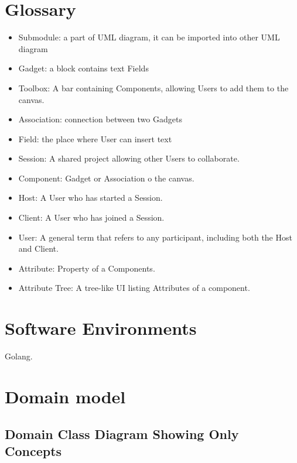 \documentclass[12pt]{article}
\begin{document}
    \section{Glossary}
    \begin{itemize}
        \item Submodule: a part of UML diagram, it can be imported into other UML diagram
        \item Gadget: a block contains text Fields
        \item Toolbox: A bar containing Components, allowing Users to add them to the canvas.
        \item Association: connection between two Gadgets
        \item Field: the place where User can insert text
        \item Session: A shared project allowing other Users to collaborate.
        \item Component: Gadget or Association o the canvas.
        \item Host: A User who has started a Session.
        \item Client: A User who has joined a Session.
        \item User: A general term that refers to any participant, including both the Host and Client.
        \item Attribute: Property of a Components.
        \item Attribute Tree: A tree-like UI listing Attributes of a component.
    \end{itemize}


    \section{Software Environments}
    Golang.



    \section {Domain model}

    \subsection{Domain Class Diagram Showing Only Concepts}
\end{document}
